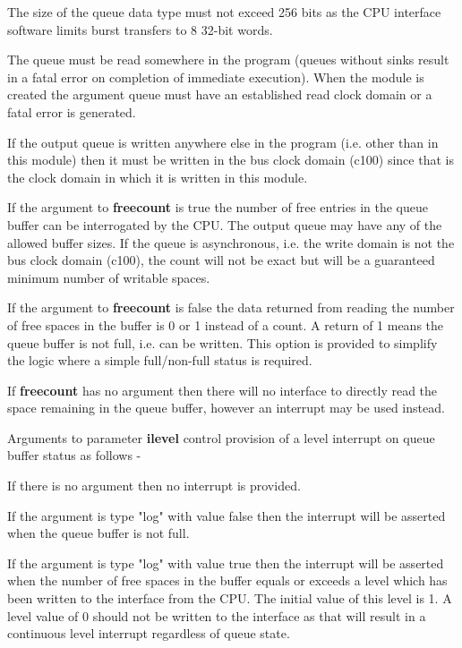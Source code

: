             The size of the queue data type must not exceed 256 bits as the CPU
            interface software limits burst transfers to 8 32-bit words.

            The queue must be read somewhere in the program (queues without
            sinks result in a fatal error on completion of immediate execution).
            When the module is created the argument queue must have an established
            read clock domain or a fatal error is generated.

            If the output queue is written anywhere else in the program (i.e. other
            than in this module) then it must be written in the bus clock domain
            (c100) since that is the clock domain in which it is written in this
            module.

            If the argument to {\bf freecount} is true the number of free entries in
            the queue buffer can be interrogated by the CPU. The output queue may
            have any of the allowed buffer sizes. If the queue is asynchronous, i.e.
            the write domain is not the bus clock domain (c100), the count will not
            be exact but will be a guaranteed minimum number of writable spaces.

            If the argument to {\bf freecount} is false the data returned from
            reading the number of free spaces in the buffer is 0 or 1 instead of a
            count. A return of 1 means the queue buffer is not full, i.e. can be
            written. This option is provided to simplify the logic where a simple
            full/non-full status is required.

            If {\bf freecount} has no argument then there will no interface to
            directly read the space remaining in the queue buffer, however an
            interrupt may be used instead.            

            Arguments to parameter {\bf ilevel} control provision of a level
            interrupt on queue buffer status as follows -

            If there is no argument then no interrupt is provided.

            If the argument is type "log" with value false then the interrupt will
            be asserted when the queue buffer is not full.

            If the argument is type "log" with value true then the interrupt will be
            asserted when the number of free spaces in the buffer equals or exceeds
            a level which has been written to the interface from the CPU. The
            initial value of this level is 1. A level value of 0 should not be
            written to the interface as that will result in a continuous level
            interrupt regardless of queue state.


